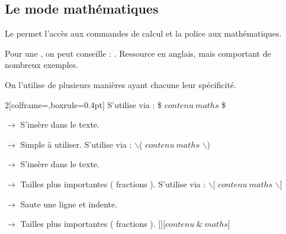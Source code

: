 \subsection{Le mode mathématiques}

\begin{Methode}
    Le  permet l'accès aux commandes de calcul et  la police aux mathématiques. 

    Pour une , on peut conseille : . Ressource en anglais, mais comportant de nombreux exemples. 


    On l'utilise de plusieurs manières ayant chacune leur spécificité. 

    \begin{MultiColonnes}{2}[colframe=\itemBaseColor,boxrule=0.4pt]
        \tcbitem[title=Mode basique] S'utilise via : \$ $contenu\  maths$ \$

        $\rightarrow$ S'insère dans le texte.

        $\rightarrow$ Simple à utiliser. 
        \tcbitem[title=Mode étendu] S'utilise via : $\backslash$( $contenu\  maths$ $\backslash$)

        $\rightarrow$ S'insère dans le texte.

        $\rightarrow$ Tailles plus importantes ( fractions ). 
        \tcbitem[title=Mode display centré] S'utilise via : $\backslash$[ $contenu\  maths$ $\backslash$]

        $\rightarrow$ Saute une ligne et indente.

        $\rightarrow$ Tailles plus importantes ( fractions ). 
        \tcbitem[title=Mode equation / align]  [][$contenu\ \& \  maths$]
    \end{MultiColonnes}
\end{Methode}
